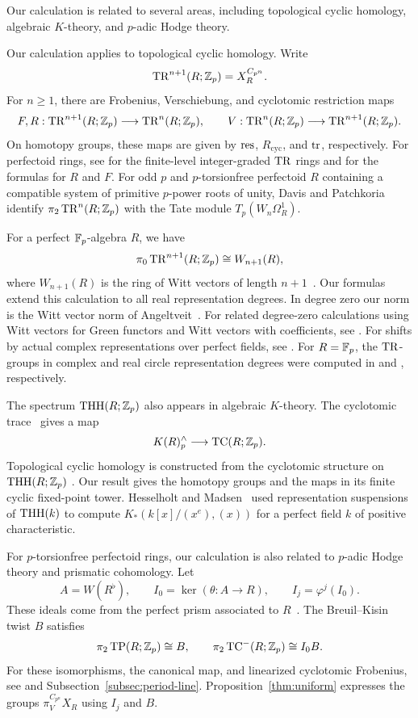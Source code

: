 Our calculation is related to several areas, including topological cyclic homology,
algebraic $K$-theory, and $p$-adic Hodge theory.

Our calculation applies to topological cyclic
homology. Write
\[
\operatorname{TR}^{n+1}(R;\mathbb Z_p)=X_R^{C_{p^n}}.
\]
For $n\ge1$, there are Frobenius, Verschiebung, and cyclotomic
restriction maps
\[
F,R:\operatorname{TR}^{n+1}(R;\mathbb Z_p)\longrightarrow
\operatorname{TR}^n(R;\mathbb Z_p),
\qquad
V:\operatorname{TR}^n(R;\mathbb Z_p)\longrightarrow
\operatorname{TR}^{n+1}(R;\mathbb Z_p).
\]
On homotopy groups, these maps are given by
$\operatorname{res}$, $R_{\mathrm{cyc}}$, and $\operatorname{tr}$, respectively.
For perfectoid rings, see \cite[Proposition~7.21]{MathewTR} for the
finite-level integer-graded $\operatorname{TR}$ rings and \cite[Theorem~3.7]{Andriopoulos}
for the formulas for $R$ and $F$.
For odd $p$ and $p$-torsionfree perfectoid $R$ containing a compatible
system of primitive $p$-power roots of unity, Davis and
Patchkoria~\cite[Section~8]{DavisPatchkoria} identify
$\pi_2\operatorname{TR}^n(R;\mathbb Z_p)$ with the Tate module $T_p(W_n\Omega_R^1)$.

For a perfect $\mathbb F_p$-algebra $R$, we have
\[
\pi_0\operatorname{TR}^{n+1}(R;\mathbb Z_p)\cong W_{n+1}(R),
\]
where $W_{n+1}(R)$ is the ring of Witt vectors of
length $n+1$~\cite[Theorem~3.3]{HM97}.
Our formulas extend this calculation to all real representation
degrees. In degree zero our norm is the Witt vector
norm of Angeltveit~\cite[Theorem~4.1]{WittNorm}.
For related degree-zero calculations using Witt vectors for Green
functors and Witt vectors with coefficients, see
\cite{BGHLWitt,DKNPWitt}.
For shifts by actual complex representations over perfect fields,
see \cite[Proposition~9.1]{HM97}.
For $R=\mathbb F_p$, the $\operatorname{TR}$-groups in complex and real circle representation
degrees were computed in \cite[Theorem~1.1]{GerhardtTR} and
\cite[Section~7]{AGTR}, respectively.

The spectrum $\operatorname{THH}(R;\mathbb Z_p)$ also appears in algebraic
$K$-theory. The cyclotomic trace~\cite{BHM} gives a map
\[
K(R)^\wedge_p\longrightarrow\operatorname{TC}(R;\mathbb Z_p).
\]
Topological cyclic homology is constructed from the
cyclotomic structure on $\operatorname{THH}(R;\mathbb Z_p)$
\cite{NS,BMCyclotomicOriginal}.
Our result gives the homotopy groups and the maps
in its finite cyclic fixed-point tower.
Hesselholt and Madsen~\cite{HMPolytopes} used representation
suspensions of $\operatorname{THH}(k)$ to compute $K_*(k[x]/(x^e),(x))$ for
a perfect field $k$ of positive characteristic.

For $p$-torsionfree perfectoid rings, our calculation
is also related to $p$-adic Hodge theory and
prismatic cohomology.
Let
\[
A=W(R^\flat),\qquad
I_0=\ker(\theta:A\to R),\qquad
I_j=\varphi^j(I_0).
\]
These ideals come from the perfect prism associated
to $R$~\cite[Theorem~3.10]{BSPrisms}. The Breuil--Kisin twist $B$ satisfies
\[
\pi_2\operatorname{TP}(R;\mathbb Z_p)\cong B,
\qquad
\pi_2\operatorname{TC}^-(R;\mathbb Z_p)\cong I_0B.
\]
For these isomorphisms, the canonical map, and linearized cyclotomic
Frobenius, see \cite[Proposition~6.5 and Remark~6.6]{BMS}
and Subsection~\ref{subsec:period-line}.
Proposition~\ref{thm:uniform} expresses the groups
$\pi_V^{C_{p^n}}X_R$ using $I_j$ and $B$.


